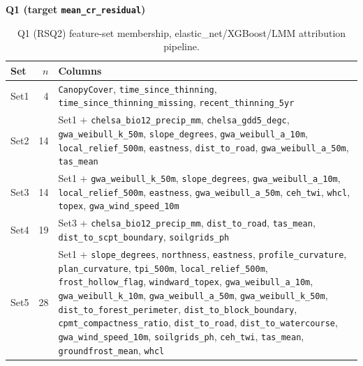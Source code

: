 \documentclass[logo,msc,ai]{infthesis}           %
\begin{document}
\begin{table}[H]
\centering
\textbf{Q1 (target \texttt{mean\_cr\_residual})}\\[4pt]
\scriptsize
\renewcommand{\arraystretch}{1.1}
\begin{tabularx}{\linewidth}{@{} l r >{\raggedright\arraybackslash}X @{}}
\toprule
Set & $n$ & Columns \\
\midrule
Set1 & 4 & \texttt{CanopyCover}, \texttt{time\_since\_thinning}, \texttt{time\_since\_thinning\_missing}, \texttt{recent\_thinning\_5yr} \\
Set2 & 14 & Set1 + \texttt{chelsa\_bio12\_precip\_mm}, \texttt{chelsa\_gdd5\_degc}, \texttt{gwa\_weibull\_k\_50m}, \texttt{slope\_degrees}, \texttt{gwa\_weibull\_a\_10m}, \texttt{local\_relief\_500m}, \texttt{eastness}, \texttt{dist\_to\_road}, \texttt{gwa\_weibull\_a\_50m}, \texttt{tas\_mean} \\
Set3 & 14 & Set1 + \texttt{gwa\_weibull\_k\_50m}, \texttt{slope\_degrees}, \texttt{gwa\_weibull\_a\_10m}, \texttt{local\_relief\_500m}, \texttt{eastness}, \texttt{gwa\_weibull\_a\_50m}, \texttt{ceh\_twi}, \texttt{whcl}, \texttt{topex}, \texttt{gwa\_wind\_speed\_10m} \\
Set4 & 19 & Set3 + \texttt{chelsa\_bio12\_precip\_mm}, \texttt{dist\_to\_road}, \texttt{tas\_mean}, \texttt{dist\_to\_scpt\_boundary}, \texttt{soilgrids\_ph} \\
Set5 & 28 & Set1 + \texttt{slope\_degrees}, \texttt{northness}, \texttt{eastness}, \texttt{profile\_curvature}, \texttt{plan\_curvature}, \texttt{tpi\_500m}, \texttt{local\_relief\_500m}, \texttt{frost\_hollow\_flag}, \texttt{windward\_topex}, \texttt{gwa\_weibull\_a\_10m}, \texttt{gwa\_weibull\_k\_10m}, \texttt{gwa\_weibull\_a\_50m}, \texttt{gwa\_weibull\_k\_50m}, \texttt{dist\_to\_forest\_perimeter}, \texttt{dist\_to\_block\_boundary}, \texttt{cpmt\_compactness\_ratio}, \texttt{dist\_to\_road}, \texttt{dist\_to\_watercourse}, \texttt{gwa\_wind\_speed\_10m}, \texttt{soilgrids\_ph}, \texttt{ceh\_twi}, \texttt{tas\_mean}, \texttt{groundfrost\_mean}, \texttt{whcl} \\
\bottomrule
\end{tabularx}
\caption{\small{Q1 (RSQ2) feature-set membership, elastic\_net/XGBoost/LMM attribution pipeline.}}
\label{tab:feature-sets-q1}
\end{table}
\end{document}

